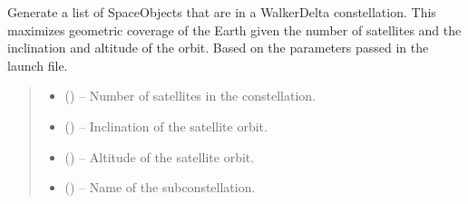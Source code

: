 \documentclass[letterpaper,10pt,english]{sphinxmanual}
\begin{document}

\begin{fulllineitems}
\label{\detokenize{fspsim.utils:fspsim.utils.LaunchModel.create_subconstellation_Space_Objects}}
\pysigstartsignatures
{}
\pysigstopsignatures
\sphinxAtStartPar
Generate a list of SpaceObjects that are in a Walker\sphinxhyphen{}Delta constellation.
This maximizes geometric coverage of the Earth given the number of satellites and the inclination and altitude of the orbit.
Based on the parameters passed in the launch file.
\begin{quote}\begin{description}
\begin{itemize}
\item {} 
\sphinxAtStartPar
{} () – Number of satellites in the constellation.

\item {} 
\sphinxAtStartPar
{} () – Inclination of the satellite orbit.

\item {} 
\sphinxAtStartPar
{} () – Altitude of the satellite orbit.

\item {} 
\sphinxAtStartPar
{} () – Name of the sub\sphinxhyphen{}constellation.


\end{itemize}
\end{description}
\end{quote}
\end{fulllineitems}
\end{document}
